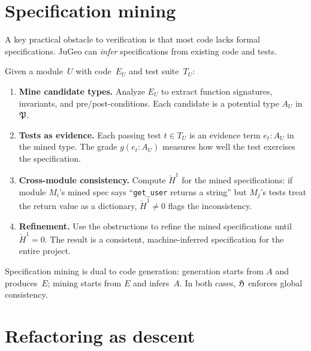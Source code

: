 \section{Specification mining}
\label{sec:spec-mining}

A key practical obstacle to verification is that most code lacks
formal specifications.  JuGeo can \emph{infer} specifications from
existing code and tests.

\begin{construction}
\label{con:spec-mining}
Given a module~$U$ with code~$E_U$ and test suite~$T_U$:
\begin{enumerate}
  \item \textbf{Mine candidate types.}\;
        Analyze $E_U$ to extract function signatures, invariants,
        and pre/post-conditions.  Each candidate is a potential
        type $A_U$ in~$\mathfrak{P}$.
  \item \textbf{Tests as evidence.}\;
        Each passing test $t \in T_U$ is an evidence term
        $e_t : A_U$ in the mined type.  The grade
        $g(e_t : A_U)$ measures how well the test exercises the
        specification.
  \item \textbf{Cross-module consistency.}\;
        Compute $\check{H}^1$ for the mined specifications:
        if module $M_i$'s mined spec says ``\texttt{get\_user}
        returns a string'' but $M_j$'s tests treat the return
        value as a dictionary, $\check{H}^1 \neq 0$ flags the
        inconsistency.
  \item \textbf{Refinement.}\;
        Use the obstructions to refine the mined specifications
        until $\check{H}^1 = 0$.  The result is a consistent,
        machine-inferred specification for the entire project.
\end{enumerate}
\end{construction}

\begin{remark}
Specification mining is dual to code generation: generation starts
from $A$ and produces~$E$; mining starts from $E$ and infers~$A$.
In both cases, $\mathfrak{H}$ enforces global consistency.
\end{remark}

\section{Refactoring as descent}
\label{sec:refactoring}

